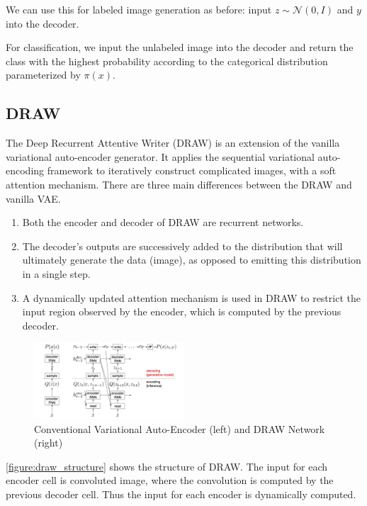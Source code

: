\documentclass[10pt]{article}
\begin{document}
We can use this for labeled image generation as before: input $z \sim \mathcal{N}(0,I)$ and $y$ into the decoder.

For classification, we input the unlabeled image into the decoder and return the class with the highest probability according to the categorical distribution parameterized by $\pi(x)$.

\subsection{DRAW}

The Deep Recurrent Attentive Writer (DRAW) \cite{gregor2015draw} is an extension of the vanilla variational auto-encoder generator.
It applies the sequential variational auto-encoding framework to iteratively construct complicated images, with a soft attention mechanism.
There are three main differences between the DRAW and vanilla VAE.
\begin{enumerate}
    \item Both the encoder and decoder of DRAW are recurrent networks.
    \item The decoder’s outputs are successively added to the distribution that will ultimately generate the data (image), as opposed to emitting this distribution in a single step.
    \item A dynamically updated attention mechanism is used in DRAW to restrict the input region observed by the encoder, which is computed by the previous decoder.
\end{enumerate}

\begin{figure}[!ht]\centering
\includegraphics[width=0.5\textwidth]{images/draw_structure.png}
\caption{Conventional Variational Auto-Encoder (left) and DRAW Network \cite{gregor2015draw} (right)}
\label{figure:draw_structure}
\end{figure}

\autoref{figure:draw_structure} shows the structure of DRAW. The input for each encoder cell is convoluted image, where the convolution is computed by the previous decoder cell. Thus the input for each encoder is dynamically computed.
\end{document}
